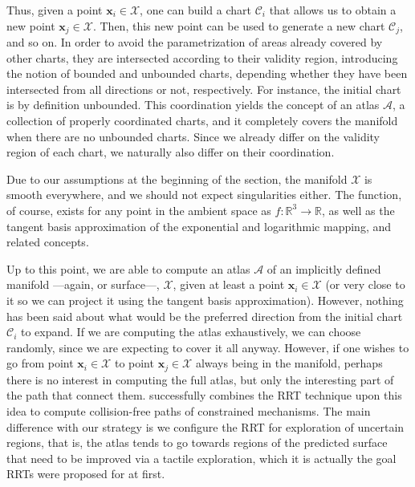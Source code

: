 Thus, given a point $\mathbf{x}_i \in \mathcal{X}$, one can build a chart $\mathcal{C}_i$ that allows us to obtain a new point $\mathbf{x}_j \in \mathcal{X}$. Then, this new point can be used to generate a new chart $\mathcal{C}_j$, and so on. In order to avoid the parametrization of areas already covered by other charts, they are intersected according to their validity region, introducing the notion of bounded and unbounded charts, depending whether they have been intersected from all directions or not, respectively. For instance, the initial chart is by definition unbounded. This coordination yields the concept of an atlas $\mathcal{A}$, a collection of properly coordinated charts, and it completely covers the manifold when there are no unbounded charts. Since we already differ on the validity region of each chart, we naturally also differ on their coordination.

Due to our assumptions at the beginning of the section, the manifold $\mathcal{X}$ is smooth everywhere, and we should not expect singularities either. The function, of course, exists for any point in the ambient space as $f:\mathbb{R}^3 \rightarrow \mathbb{R}$, as well as the tangent basis approximation of the exponential and logarithmic mapping, and related concepts.

Up to this point, we are able to compute an atlas $\mathcal{A}$ of an implicitly defined manifold ---again, or surface---, $\mathcal{X}$, given at least a point $\mathbf{x}_i \in \mathcal{X}$ (or very close to it so we can project it using the tangent basis approximation). However, nothing has been said about what would be the preferred direction from the initial chart $\mathcal{C}_i$ to expand. If we are computing the atlas exhaustively, we can choose randomly, since we are expecting to cover it all anyway. However, if one wishes to go from point $\mathbf{x}_i \in \mathcal{X}$ to point $\mathbf{x}_j \in \mathcal{X}$ always being in the manifold, perhaps there is no interest in computing the full atlas, but only the interesting part of the path that connect them. \citet{Jaillet2013Path} successfully combines the RRT technique upon this idea to compute collision-free paths of constrained mechanisms. The main difference with our strategy is we configure the RRT for exploration of uncertain regions, that is, the atlas tends to go towards regions of the predicted surface that need to be improved via a tactile exploration, which it is actually the goal RRTs were proposed for at first.



